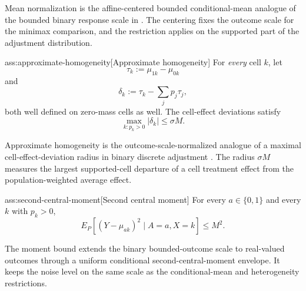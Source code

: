 \documentclass[11pt]{article}
\begin{document}
Mean normalization is the affine-centered bounded conditional-mean analogue of the bounded binary response scale in \citet{ZengBalakrishnanHanKennedy2024}. The centering fixes the outcome scale for the minimax comparison, and the restriction applies on the supported part of the adjustment distribution.

\begin{assumptionv}{ass:approximate-homogeneity}[Approximate homogeneity]
For \emph{every} cell \(k\), let
\[
\tau_k:=\mu_{1k}-\mu_{0k}
\]
and
\[
\delta_k:=\tau_k-\sum_j p_j\tau_j ,
\]
both well defined on zero-mass cells as well.
The cell-effect deviations satisfy
\[
\max_{k:p_k>0}|\delta_k|\le \sigma M .
\]
\end{assumptionv}

Approximate homogeneity is the outcome-scale-normalized analogue of a maximal cell-effect-deviation radius in binary discrete adjustment \citep{ZengBalakrishnanHanKennedy2024}. The radius \(\sigma M\) measures the largest supported-cell departure of a cell treatment effect from the population-weighted average effect.

\begin{assumptionv}{ass:second-central-moment}[Second central moment]
For every \(a\in\{0,1\}\) and every \(k\) with \(p_k>0\),
\[
E_P\!\left[(Y-\mu_{ak})^2\mid A=a,X=k\right]\le M^2 .
\]
\end{assumptionv}

The moment bound extends the binary bounded-outcome scale to real-valued outcomes through a uniform conditional second-central-moment envelope. It keeps the noise level on the same scale as the conditional-mean and heterogeneity restrictions.
\end{document}
